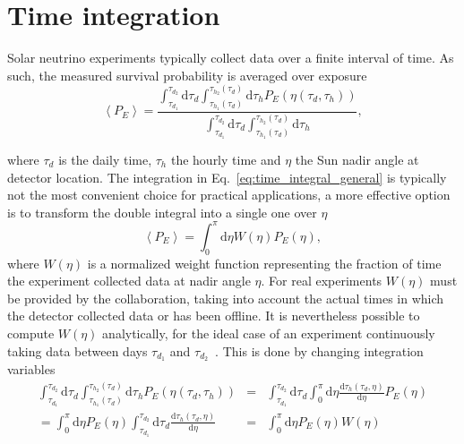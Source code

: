 \documentclass[11pt,a4paper]{article}
\newcommand{\de}[0]{\text{d}}
\begin{document}
\section{Time integration}
Solar neutrino experiments typically collect data over a finite interval of time. As such, the measured survival probability is averaged over exposure
\begin{equation}\label{eq:time_integral_general}
	\left< P_E \right> = \frac{\int_{\tau_{d_1}}^{\tau_{d_2}} \de \tau_d \int_{\tau_{h_1} (\tau_d)}^{\tau_{h_2} (\tau_d)} \de \tau_h P_E \left(\eta(\tau_d, \tau_h) \right)}{\int_{\tau_{d_1}}^{\tau_{d_2}} \de \tau_d \int_{\tau_{h_1} (\tau_d)}^{\tau_{h_2} (\tau_d)} \de \tau_h },
\end{equation}

where $\tau_d$ is the daily time, $\tau_h$ the hourly time and $\eta$ the Sun nadir angle at detector location. The integration in Eq.~\ref{eq:time_integral_general} is typically not the most convenient choice for practical applications, a more effective option is to transform the double integral into a single one over $\eta$~\cite{Lisi:1997yc}
\begin{equation}
	\left< P_E \right> = \int_{0}^{\pi} \de \eta W(\eta) P_E(\eta),
\end{equation}
where $W(\eta)$ is a normalized weight function representing the fraction of time the experiment collected data at nadir angle $\eta$.
For real experiments $W(\eta)$ must be provided by the collaboration, taking into account the actual times in which the detector collected data or has been offline. It is nevertheless possible to compute $W(\eta)$ analytically, for the ideal case of an experiment continuously taking data between days $\tau_{d_1}$ and $\tau_{d_2}$~\cite{Lisi:1997yc}.
This is done by changing integration variables
\begin{eqnarray}
	\int_{\tau_{d_1}}^{\tau_{d_2}} \de \tau_d \int_{\tau_{h_1} (\tau_d)}^{\tau_{h_2} (\tau_d)} \de \tau_h P_E \left(\eta(\tau_d, \tau_h) \right) &=& \int_{\tau_{d_1}}^{\tau_{d_2}} \de \tau_d \int_{0}^{\pi} \de \eta \frac{\de \tau_h (\tau_d, \eta)}{\de \eta} P_E \left(\eta \right) \\
	= \int_{0}^{\pi} \de \eta  P_E \left(\eta \right) \int_{\tau_{d_1}}^{\tau_{d_2}} \de \tau_d \frac{\de \tau_h (\tau_d, \eta)}{\de \eta} &=& \int_{0}^{\pi} \de \eta P_E(\eta) W(\eta) \label{eq:integral_W}
\end{eqnarray}
\end{document}
